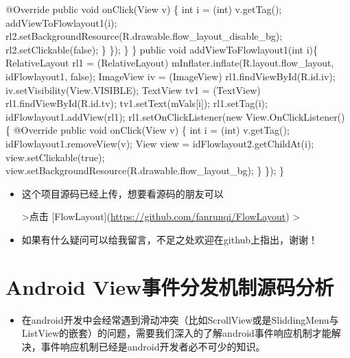\documentclass[9pt, b5paper]{article}
\begin{document}
                @Override
                public void onClick(View v) \{
                    int i = (int) v.getTag();
                    addViewToFlowlayout1(i);
                    rl2.setBackgroundResource(R.drawable.flow\_layout\_disable\_bg);
                    rl2.setClickable(false);
                \}
            \});
        \}
    \}
    public void addViewToFlowlayout1(int i)\{
        RelativeLayout rl1 = (RelativeLayout) mInflater.inflate(R.layout.flow\_layout, idFlowlayout1, false);
        ImageView iv = (ImageView) rl1.findViewById(R.id.iv);
        iv.setVisibility(View.VISIBLE);
        TextView tv1 = (TextView) rl1.findViewById(R.id.tv);
        tv1.setText(mVals[i]);
        rl1.setTag(i);
        idFlowlayout1.addView(rl1);
        rl1.setOnClickListener(new View.OnClickListener() \{
            @Override
            public void onClick(View v) \{
                int i = (int) v.getTag();
                idFlowlayout1.removeView(v);
                View view = idFlowlayout2.getChildAt(i);
                view.setClickable(true);
                view.setBackgroundResource(R.drawable.flow\_layout\_bg);
            \}
        \});
    \}
\begin{itemize}
\item 这个项目源码已经上传，想要看源码的朋友可以 

>点击 [FlowLayout](\url{https://github.com/fanrunqi/FlowLayout}) 
>
\item 如果有什么疑问可以给我留言，不足之处欢迎在github上指出，谢谢！
\end{itemize}
\section{Android View事件分发机制源码分析}
\label{sec-12}
\begin{itemize}
\item 在android开发中会经常遇到滑动冲突（比如ScrollView或是SliddingMenu与ListView的嵌套）的问题，需要我们深入的了解android事件响应机制才能解决，事件响应机制已经是android开发者必不可少的知识。
\end{itemize}
\end{document}
